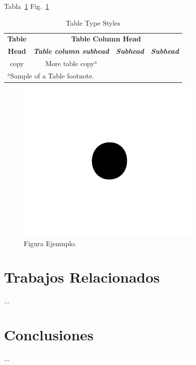 \documentclass[conference]{IEEEtran}
\begin{document}
Tabla~\ref{tab:1}
Fig.~\ref{fig:1}

\begin{table}[htbp]
\caption{Table Type Styles}
\begin{center}
\begin{tabular}{|c|c|c|c|}
\hline
            \textbf{Table} & \multicolumn{3}{|c|}{\textbf{Table Column Head}}                                                         \\
\cline{2-4} 
            \textbf{Head}  & \textbf{\textit{Table column subhead}}           & \textbf{\textit{Subhead}} & \textbf{\textit{Subhead}} \\
\hline
            copy           & More table copy$^{\mathrm{a}}$                   &                           &                           \\
\hline
\multicolumn{4}{l}{$^{\mathrm{a}}$Sample of a Table footnote.}
\end{tabular}
\label{tab:1}
\end{center}
\end{table}

\begin{figure}[htbp]
\centerline{\includegraphics{Figures/fig1.png}}
\caption{Figura Ejemnplo.}
\label{fig:1}
\end{figure}


\section{Trabajos Relacionados}
\label{sec:TR}
...


\section{Conclusiones}
\label{sec:Conclusiones}
...

  

\end{document}
